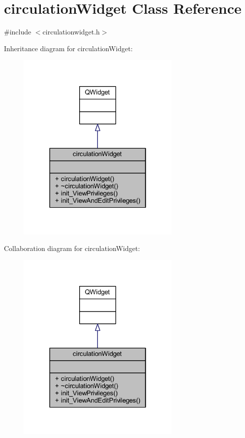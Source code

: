 \hypertarget{classcirculation_widget}{}\section{circulation\+Widget Class Reference}
\label{classcirculation_widget}


{\ttfamily \#include $<$circulationwidget.\+h$>$}



Inheritance diagram for circulation\+Widget\+:
\nopagebreak
\begin{figure}[H]
\begin{center}
\leavevmode
\includegraphics[width=226pt]{classcirculation_widget__inherit__graph}
\end{center}
\end{figure}


Collaboration diagram for circulation\+Widget\+:
\nopagebreak
\begin{figure}[H]
\begin{center}
\leavevmode
\includegraphics[width=226pt]{classcirculation_widget__coll__graph}
\end{center}
\end{figure}
